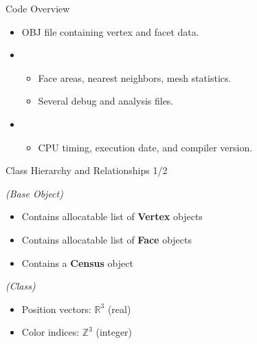 \begin{frame}{Code Overview}
    \begin{itemize}
        \item {} OBJ file containing vertex and facet data.
        \item {} 
            \begin{itemize}
                \item Face areas, nearest neighbors, mesh statistics.
                \item Several debug and analysis files.
            \end{itemize}
        \item {}
            \begin{itemize}
                \item CPU timing, execution date, and compiler version.
            \end{itemize}
    \end{itemize}
\end{frame}

\begin{frame}[fragile]{Class Hierarchy and Relationships 1/2}
\begin{description}[leftmargin=2cm]
    \item[\textbf{Model}] \textit{(Base Object)}
        \begin{itemize}
            \item Contains allocatable list of \textbf{Vertex} objects
            \item Contains allocatable list of \textbf{Face} objects
            \item Contains a \textbf{Census} object
        \end{itemize}
        
    \item[\textbf{Vertex}] \textit{(Class)}  
        \begin{itemize}
            \item Position vectors: $\mathbb{R}^3$ (real)
            \item Color indices: $\mathbb{Z}^3$ (integer)
        \end{itemize}
\end{description}
\end{frame}

